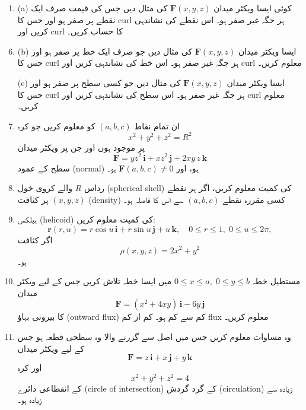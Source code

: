 \begin{enumerate}
\begin{enumerate}
\item  
(a) کوئی ایسا ویکٹر میدان \( \mathbf{F}(x,y,z) \) کی مثال دیں جس کی قیمت صرف ایک نقطے پر صفر ہو اور جس کا curl ہر جگہ غیر صفر ہو۔ اس نقطے کی نشاندہی کریں اور curl کا حساب کریں۔

\end{enumerate}






\begin{enumerate}
\setcounter{enumi}{5}

\item  
(b) ایسا ویکٹر میدان \( \mathbf{F}(x,y,z) \) کی مثال دیں جو صرف ایک خط پر صفر ہو اور جس کا curl ہر جگہ غیر صفر ہو۔ اس خط کی نشاندہی کریں اور curl معلوم کریں۔

(c) ایسا ویکٹر میدان \( \mathbf{F}(x,y,z) \) کی مثال دیں جو کسی سطح پر صفر ہو اور جس کا curl ہر جگہ غیر صفر ہو۔ اس سطح کی نشاندہی کریں اور curl معلوم کریں۔

\setcounter{enumi}{6}

\item  
ان تمام نقاط \((a,b,c)\) کو معلوم کریں جو کرہ
\[
x^2 + y^2 + z^2 = R^2
\]
پر موجود ہوں اور جن پر ویکٹر میدان
\[
\mathbf{F} = yz^2\,\mathbf{i} + xz^2\,\mathbf{j} + 2xy\,z\,\mathbf{k}
\]
سطح کے عمود (normal) ہو، اور \( \mathbf{F}(a,b,c) \neq 0 \) ہو۔

\setcounter{enumi}{7}

\item  
رداس \(R\) والے کروی خول (spherical shell) کی کمیت معلوم کریں، اگر ہر نقطے \((x,y,z)\) پر کثافت (density) کسی مقررہ نقطے \((a,b,c)\) سے اس کا فاصلہ ہو۔

\item  
ہیلکس (helicoid) کی کمیت معلوم کریں:
\[
\mathbf{r}(r,u) = r\cos u\,\mathbf{i} + r\sin u\,\mathbf{j} + u\,\mathbf{k},
\quad 0 \le r \le 1,\; 0 \le u \le 2\pi,
\]
اگر کثافت
\[
\rho(x,y,z) = 2x^2 + y^2
\]
ہو۔

\item  
مستطیل خطہ \(0 \le x \le a,\; 0 \le y \le b\) میں ایسا خطہ تلاش کریں جس کے لیے ویکٹر میدان
\[
\mathbf{F} = (x^2 + 4xy)\,\mathbf{i} - 6y\,\mathbf{j}
\]
کا بیرونی بہاؤ (outward flux) کم سے کم ہو۔ کم از کم flux معلوم کریں۔

\item  
وہ مساوات معلوم کریں جس میں اصل سے گزرنے والا وہ سطحی قطعہ ہو جس کے لیے ویکٹر میدان
\[
\mathbf{F} = z\,\mathbf{i} + x\,\mathbf{j} + y\,\mathbf{k}
\]
اور کرہ
\[
x^2 + y^2 + z^2 = 4
\]
کے انقطاعی دائرے (circle of intersection) کے گرد گردش (circulation) زیادہ سے زیادہ ہو۔


\end{enumerate}
\end{enumerate}
